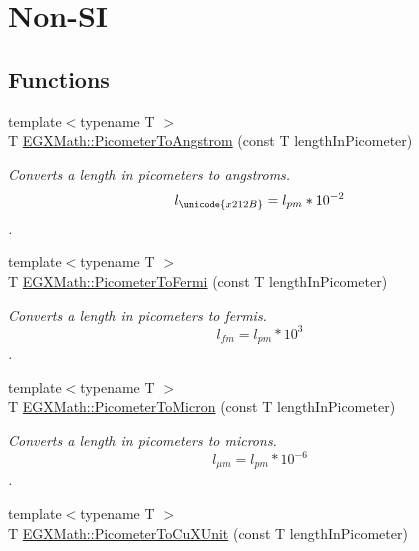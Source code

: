 \hypertarget{group___e_g_x_math-_conversions-_length_conversions-_s_i-_picometer-_non-_s_i}{}\section{Non-\/\+SI}
\label{group___e_g_x_math-_conversions-_length_conversions-_s_i-_picometer-_non-_s_i}
\subsection*{Functions}
\begin{DoxyCompactItemize}
\item 
{\footnotesize template$<$typename T $>$ }\\T \mbox{\hyperlink{group___e_g_x_math-_conversions-_length_conversions-_s_i-_picometer-_non-_s_i_ga0b1b4a3ec4ea0110477f4547025d2719}{E\+G\+X\+Math\+::\+Picometer\+To\+Angstrom}} (const T length\+In\+Picometer)
\begin{DoxyCompactList}\small\item\em Converts a length in picometers to angstroms. \[ l_{\unicode{x212B}}=l_{pm} * 10^{-2} \]. \end{DoxyCompactList}\item 
{\footnotesize template$<$typename T $>$ }\\T \mbox{\hyperlink{group___e_g_x_math-_conversions-_length_conversions-_s_i-_picometer-_non-_s_i_ga13ec47b0b50eca30313bb7902a28f0c9}{E\+G\+X\+Math\+::\+Picometer\+To\+Fermi}} (const T length\+In\+Picometer)
\begin{DoxyCompactList}\small\item\em Converts a length in picometers to fermis. \[ l_{fm}=l_{pm} * 10^{3} \]. \end{DoxyCompactList}\item 
{\footnotesize template$<$typename T $>$ }\\T \mbox{\hyperlink{group___e_g_x_math-_conversions-_length_conversions-_s_i-_picometer-_non-_s_i_gad8fddabe74b111596888c370081f725e}{E\+G\+X\+Math\+::\+Picometer\+To\+Micron}} (const T length\+In\+Picometer)
\begin{DoxyCompactList}\small\item\em Converts a length in picometers to microns. \[ l_{\mu m}=l_{pm} * 10^{-6} \]. \end{DoxyCompactList}\item 
{\footnotesize template$<$typename T $>$ }\\T \mbox{\hyperlink{group___e_g_x_math-_conversions-_length_conversions-_s_i-_picometer-_non-_s_i_gab393c0c7c90ba14ff56f8eac343524ff}{E\+G\+X\+Math\+::\+Picometer\+To\+Cu\+X\+Unit}} (const T length\+In\+Picometer)

\end{DoxyCompactItemize}
